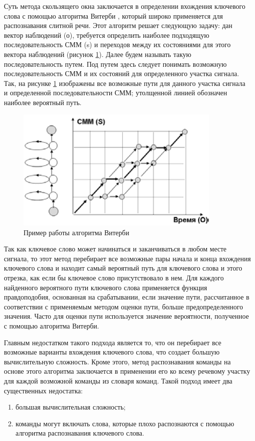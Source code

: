 \documentclass[a4paper,14pt,russian,utf8,nocolumnsxix,nocolumnxxxi,nocolumnxxxii]{eskdtext}
\begin{document}
Суть метода скользящего окна заключается в определении вхождения ключевого слова с помощью алгоритма Витерби \cite{couvreur}, который широко применяется для распознавания слитной речи. Этот алгоритм решает следующую задачу: дан вектор наблюдений (о), требуется определить наиболее подходящую последовательность СММ (s) и переходов между их состояниями для этого вектора наблюдений (рисунок \ref{viterbi}). Далее будем называть такую последовательность путем. Под путем здесь следует понимать возможную последовательность СММ и их состояний для определенного участка сигнала. Так, на рисунке \ref{viterbi} изображены все возможные пути для данного участка сигнала и определенной последовательности СММ; утолщенной линией обозначен наиболее вероятный путь. 
\begin{figure}[H]	
	\centering
	\includegraphics[width=100mm]{viterbi.png}			
	\caption{Пример работы алгоритма Витерби}
	\label{viterbi}
\end{figure}
Так как ключевое слово может начинаться и заканчиваться в любом месте сигнала, то этот метод перебирает все возможные пары начала и конца
вхождения ключевого слова и находит самый вероятный путь для ключевого слова и этого отрезка, как если бы ключевое слово присутствовало в нем. Для каждого найденного вероятного пути ключевого слова применяется функция правдоподобия, основанная на срабатывании, если значение пути, рассчитанное в соответствии с применяемым методом оценки пути, больше предопределенного значения. Часто для оценки пути используется значение вероятности, полученное с помощью алгоритма Витерби.

Главным недостатком такого подхода является то, что он перебирает все возможные варианты вхождения ключевого слова, что создает большую вычислительную сложность. Кроме этого, метод распознавания команды на основе этого алгоритма заключается в применении
его ко всему речевому участку для каждой возможной команды из словаря команд. Такой подход имеет два существенных недостатка:
\begin{enumerate}[1)]
	\item большая вычислительная сложность;
	\item команды могут включать слова, которые плохо распознаются с помощью алгоритма распознавания ключевого слова.
\end{enumerate}
 
\end{document}
